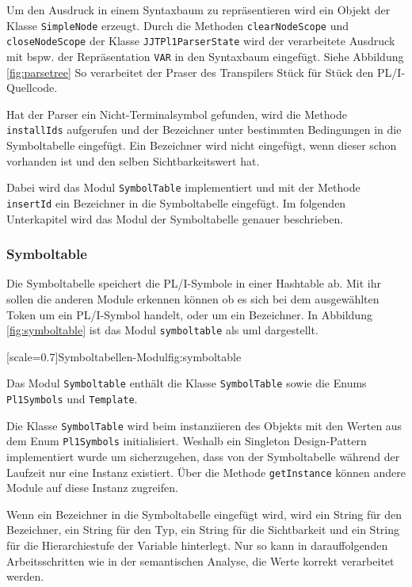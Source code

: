 Um den Ausdruck in einem Syntaxbaum zu repräsentieren wird ein Objekt der Klasse \verb+SimpleNode+ erzeugt. Durch die Methoden \verb+clearNodeScope+ und \verb+closeNodeScope+ der Klasse \verb+JJTPl1ParserState+ wird der verarbeitete Ausdruck mit bspw. der Repräsentation \verb+VAR+ in den Syntaxbaum eingefügt. 
Siehe Abbildung \ref{fig:parsetree} So verarbeitet der Praser des Transpilers Stück für Stück den PL/I-Quellcode. 

Hat der Parser ein Nicht-Terminalsymbol gefunden, wird die Methode \verb+installIds+ aufgerufen und der Bezeichner unter bestimmten Bedingungen in die Symboltabelle eingefügt. 
Ein Bezeichner wird nicht eingefügt, 
wenn dieser schon vorhanden ist und den selben Sichtbarkeitswert hat.

Dabei wird das Modul \verb+SymbolTable+ implementiert und mit der Methode \verb+insertId+ ein Bezeichner in die Symboltabelle eingefügt. Im folgenden Unterkapitel wird das Modul der Symboltabelle genauer beschrieben. 

\pagebreak
\subsubsection{Symboltable}
Die Symboltabelle speichert die PL/I-Symbole in einer Hashtable ab. Mit ihr sollen die anderen Module
erkennen können ob es sich bei dem ausgewählten Token um ein PL/I-Symbol handelt, oder um ein Bezeichner.
In Abbildung \ref{fig:symboltable} ist das Modul \verb+symboltable+ als \ac{uml} dargestellt.

[scale=0.7]{Symboltabellen-Modul}{fig:symboltable}
\pagebreak

Das Modul \verb+Symboltable+ enthält die Klasse \verb+SymbolTable+
sowie die Enums \verb+Pl1Symbols+ und \verb+Template+.

Die Klasse \verb+SymbolTable+ wird beim instanziieren des Objekts mit den Werten aus dem Enum \verb+Pl1Symbols+ initialisiert. Weshalb ein Singleton Design-Pattern implementiert wurde um sicherzugehen, dass von der Symboltabelle während der Laufzeit nur eine Instanz existiert. 
Über die Methode \verb+getInstance+ können andere Module auf diese Instanz zugreifen.

Wenn ein Bezeichner in die Symboltabelle eingefügt wird, wird ein String für den Bezeichner, ein String für den Typ, ein String für die Sichtbarkeit und ein String für die Hierarchiestufe der Variable hinterlegt. Nur so kann in darauffolgenden Arbeitsschritten wie in der semantischen Analyse, die Werte korrekt verarbeitet werden.

